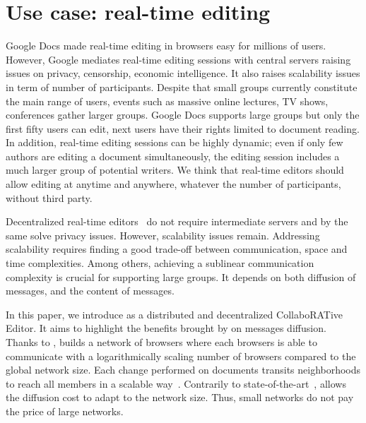 
\section{Use case: real-time editing}
\label{sec:use-case}

Google Docs made real-time editing in browsers easy for millions of
users. However, Google mediates real-time editing sessions with central servers
raising issues on privacy, censorship, economic intelligence. It also raises
scalability issues in term of number of participants.  Despite that small groups
currently constitute the main range of users, events such as massive online
lectures, TV shows, conferences gather larger groups.  Google Docs supports
large groups but only the first fifty users can edit, next users have their
rights limited to document reading. In addition, real-time editing sessions can
be highly dynamic; even if only few authors are editing a document
simultaneously, the editing session includes a much larger group of potential
writers. We think that real-time editors should allow editing at anytime and
anywhere, whatever the number of participants, without third party.

Decentralized real-time editors~\cite{oster2006data, sun1998operational,
  sun2009contextbased} do not require intermediate servers and by the same solve
privacy issues. However, scalability issues remain.  Addressing scalability
requires finding a good trade-off between communication, space and time
complexities. Among others, achieving a sublinear communication complexity is
crucial for supporting large groups.  It depends on both diffusion of messages,
and the content of messages.

In this paper, we introduce \CRATE as a distributed and decentralized
CollaboRATive Editor. It aims to highlight the benefits brought by \SPRAY on
messages diffusion. Thanks to \SPRAY, \CRATE builds a network of browsers where
each browsers is able to communicate with a logarithmically scaling number of
browsers compared to the global network size. Each change performed on documents
transits neighborhoods to reach all members in a scalable
way~\cite{birman1999bimodal}. Contrarily to
state-of-the-art~\cite{tolgyeski2009adaptive, voulgaris2005cyclon}, \SPRAY
allows the diffusion cost to adapt to the network size. Thus, small networks do
not pay the price of large networks.

